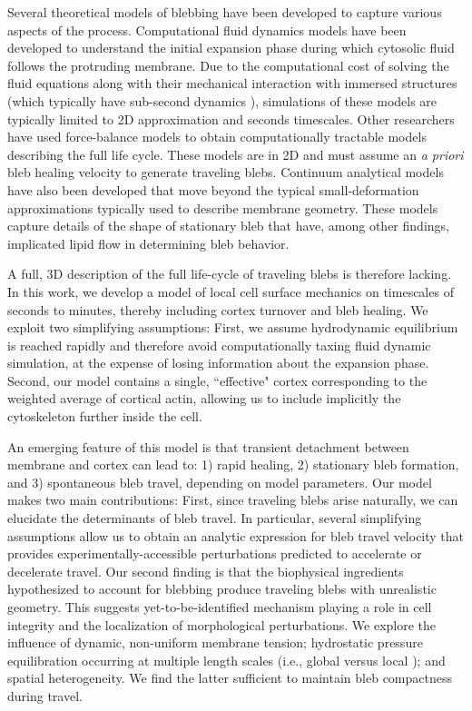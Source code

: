 Several theoretical models of blebbing have been developed to capture various aspects of the process. 
Computational fluid dynamics models \cite{Strychalski:2013eo,Strychalski:2015fu,Young:2010dp} have been developed to understand the initial expansion phase during which cytosolic fluid follows the protruding membrane. Due to the computational cost of solving the fluid equations along with their mechanical interaction with immersed structures (which typically have sub-second dynamics \cite{Strychalski:2013eo,Strychalski:2015fu}), simulations of these models are typically limited to 2D approximation and seconds timescales. 
Other researchers \cite{Lim:2012fz} have used force-balance models \cite{Alert:2015gz,Kapustina:2013gc} to obtain computationally tractable models describing the full life cycle. These models are in 2D and must assume an {\it a priori} bleb healing velocity to generate traveling blebs. 
Continuum analytical models  \cite{Woolley:2013bx,Woolley:2014jm, Woolley:2015jn} have also been developed that move beyond the typical small-deformation approximations typically used to describe membrane geometry. These models capture details of the shape of stationary bleb that have, among other findings, implicated lipid flow in determining bleb behavior. 

A full, 3D description of the full life-cycle of traveling blebs is therefore lacking. In this work, we develop a model of local cell surface mechanics on timescales of seconds to minutes, thereby including cortex turnover and bleb healing. We exploit two simplifying assumptions: First, we assume hydrodynamic equilibrium is reached rapidly and therefore avoid computationally taxing fluid dynamic simulation, at the expense of losing information about the expansion phase. Second, our model contains a single, ``effective" cortex corresponding to the weighted average of cortical actin, allowing us to include implicitly the cytoskeleton further inside the cell. 

An emerging feature of this model is that transient detachment between membrane and cortex can lead to: 1) rapid healing, 2) stationary bleb formation, and 3) spontaneous bleb travel, depending on model parameters. Our model makes two main contributions: First, since traveling blebs arise naturally, we can  elucidate the determinants of bleb travel. In particular,  
several simplifying assumptions allow us to obtain an analytic expression for bleb travel velocity that provides experimentally-accessible perturbations predicted to accelerate or decelerate travel. 
Our second finding is that the biophysical ingredients hypothesized to account for blebbing produce traveling blebs with unrealistic geometry. 
This suggests yet-to-be-identified mechanism playing a role in cell integrity and the localization of morphological perturbations. 
We explore the influence of dynamic, non-uniform membrane tension;  hydrostatic pressure equilibration occurring at multiple length scales (i.e., global versus local \cite{Strychalski:2015fu}); and spatial heterogeneity. We find the latter sufficient to maintain bleb compactness during travel.

